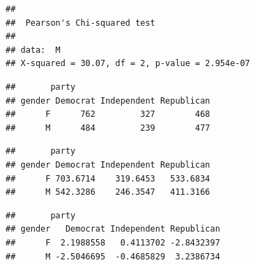 \documentclass[
]{book}
\newenvironment{Shaded}{\begin{snugshade}}{\end{snugshade}}
\newcommand{\CommentTok}[1]{\textcolor[rgb]{0.56,0.35,0.01}{\textit{#1}}}
\newcommand{\NormalTok}[1]{#1}
\newcommand{\SpecialCharTok}[1]{\textcolor[rgb]{0.00,0.00,0.00}{#1}}
\begin{document}
\begin{verbatim}
## 
##  Pearson's Chi-squared test
## 
## data:  M
## X-squared = 30.07, df = 2, p-value = 2.954e-07
\end{verbatim}

\begin{Shaded}
\end{Shaded}

\begin{verbatim}
##       party
## gender Democrat Independent Republican
##      F      762         327        468
##      M      484         239        477
\end{verbatim}

\begin{Shaded}
\end{Shaded}

\begin{verbatim}
##       party
## gender Democrat Independent Republican
##      F 703.6714    319.6453   533.6834
##      M 542.3286    246.3547   411.3166
\end{verbatim}

\begin{Shaded}
\end{Shaded}

\begin{verbatim}
##       party
## gender   Democrat Independent Republican
##      F  2.1988558   0.4113702 -2.8432397
##      M -2.5046695  -0.4685829  3.2386734
\end{verbatim}

\begin{Shaded}
\end{Shaded}
\end{document}

